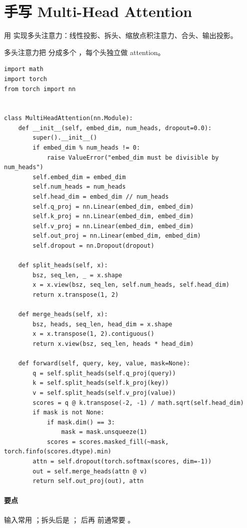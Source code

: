\section{手写 Multi-Head Attention}
\begin{interview}
用  实现多头注意力：线性投影、拆头、缩放点积注意力、合头、输出投影。
\end{interview}
\begin{answer}
多头注意力把  分成多个 ，每个头独立做 attention。
\begin{lstlisting}
import math
import torch
from torch import nn


class MultiHeadAttention(nn.Module):
    def __init__(self, embed_dim, num_heads, dropout=0.0):
        super().__init__()
        if embed_dim % num_heads != 0:
            raise ValueError("embed_dim must be divisible by num_heads")
        self.embed_dim = embed_dim
        self.num_heads = num_heads
        self.head_dim = embed_dim // num_heads
        self.q_proj = nn.Linear(embed_dim, embed_dim)
        self.k_proj = nn.Linear(embed_dim, embed_dim)
        self.v_proj = nn.Linear(embed_dim, embed_dim)
        self.out_proj = nn.Linear(embed_dim, embed_dim)
        self.dropout = nn.Dropout(dropout)

    def split_heads(self, x):
        bsz, seq_len, _ = x.shape
        x = x.view(bsz, seq_len, self.num_heads, self.head_dim)
        return x.transpose(1, 2)

    def merge_heads(self, x):
        bsz, heads, seq_len, head_dim = x.shape
        x = x.transpose(1, 2).contiguous()
        return x.view(bsz, seq_len, heads * head_dim)

    def forward(self, query, key, value, mask=None):
        q = self.split_heads(self.q_proj(query))
        k = self.split_heads(self.k_proj(key))
        v = self.split_heads(self.v_proj(value))
        scores = q @ k.transpose(-2, -1) / math.sqrt(self.head_dim)
        if mask is not None:
            if mask.dim() == 3:
                mask = mask.unsqueeze(1)
            scores = scores.masked_fill(~mask, torch.finfo(scores.dtype).min)
        attn = self.dropout(torch.softmax(scores, dim=-1))
        out = self.merge_heads(attn @ v)
        return self.out_proj(out), attn
\end{lstlisting}
\paragraph{要点} 输入常用 ；拆头后是 ； 后再  前通常要 。
\end{answer}

